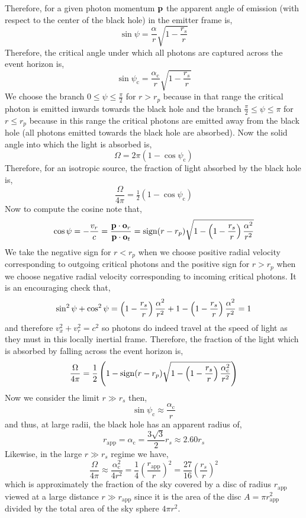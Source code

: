 \documentclass[12pt]{article}
\begin{document}
Therefore, for a given photon momentum $\bf{p}$ the apparent angle of emission (with respect to the center of the black hole) in the emitter frame is,
\[ \sin{\psi} = \frac{\alpha}{r} \sqrt{1 - \frac{r_s}{r}} \]
Therefore, the critical angle under which all photons are captured across the event horizon is,
\[ \sin{\psi_{\text{c}}} = \frac{\alpha_{\text{c}}}{r} \sqrt{1 - \frac{r_s}{r}} \]
We choose the branch $0 \le \psi \le \frac{\pi}{2}$ for $r > r_p$ because in that range the critical photon is emitted inwards towards the black hole and the branch $\frac{\pi}{2} \le \psi \le \pi$ for $r \le r_p$ because in this range the critical photons are emitted away from the black hole (all photons emitted towards the black hole are absorbed). Now the solid angle into which the light is absorbed is,
\[ \Omega = 2\pi (1 - \cos{\psi_{\text{c}}}) \]
Therefore, for an isotropic source, the fraction of light absorbed by the black hole is,
\[ \frac{\Omega}{4 \pi} = \tfrac{1}{2} (1 - \cos{\psi_{\text{c}}}) \]
Now to compute the cosine note that,
\[ \cos{\psi} = -\frac{v_r}{c} = \frac{\bf{p} \cdot \bf{o}_r}{\bf{p} \cdot \bf{o}_t} = \mathrm{sign}{(r - r_p)} \sqrt{1 - \sh{r} \frac{\alpha^2}{r^2}}  \] 
We take the negative sign for $r < r_p$ when we choose positive radial velocity corresponding to outgoing critical photons and the positive sign for $r > r_p$ when we choose negative radial velocity corresponding to incoming critical photons.
It is an encouraging check that,
\[ \sin^2{\psi} + \cos^2{\psi} = \sh{r} \frac{\alpha^2}{r^2} + 1 - \sh{r} \frac{\alpha^2}{r^2} = 1 \]
and therefore $v_x^2 + v_r^2 = c^2$ so photons do indeed travel at the speed of light as they must in this locally inertial frame. Therefore, the fraction of the light which is absorbed by falling across the event horizon is,
\[ \frac{\Omega}{4 \pi} = \frac{1}{2} \left(1 - \mathrm{sign}{(r - r_p)} \sqrt{1 - \sh{r} \frac{\alpha_{\text{c}}^2}{r^2}} \right) \]
Now we consider the limit $r \gg r_s$ then,
\[ \sin{\psi_{\text{c}}} \approx \frac{\alpha_{\text{c}}}{r} \]
and thus, at large radii, the black hole has an apparent radius of,
\[ r_{\text{app}} = \alpha_{\text{c}} = \frac{3 \sqrt{3}}{2} r_s \approx 2.60 r_s \]
Likewise, in the large $r \gg r_s$ regime we have,
\[ \frac{\Omega}{4 \pi} \approx \frac{\alpha_{\text{c}}^2}{4 r^2} = \frac{1}{4} \left( \frac{r_{\text{app}}}{r} \right)^2 = \frac{27}{16} \left( \frac{r_s}{r} \right)^2 \]
which is approximately the fraction of the sky covered by a disc of radius $r_{\text{app}}$ viewed at a large distance $r \gg r_{\text{app}}$ since it is the area of the disc $A = \pi r_{\text{app}}^2$ divided by the total area of the sky sphere $4 \pi r^2$. 
\end{document}
